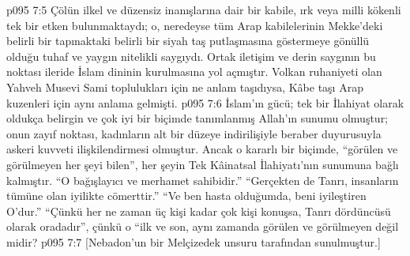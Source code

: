 \vs p095 7:5 Çölün ilkel ve düzensiz inanışlarına dair bir kabile, ırk veya milli kökenli tek bir etken bulunmaktaydı; o, neredeyse tüm Arap kabilelerinin Mekke’deki belirli bir tapınaktaki belirli bir siyah taş putlaşmasına göstermeye gönüllü olduğu tuhaf ve yaygın nitelikli saygıydı. Ortak iletişim ve derin saygının bu noktası ileride İslam dininin kurulmasına yol açmıştır. Volkan ruhaniyeti olan Yahveh Musevi Sami toplulukları için ne anlam taşıdıysa, Kâbe taşı Arap kuzenleri için aynı anlama gelmişti.
\vs p095 7:6 İslam’ın gücü; tek bir İlahiyat olarak oldukça belirgin ve çok iyi bir biçimde tanımlanmış Allah’ın sunumu olmuştur; onun zayıf noktası, kadınların alt bir düzeye indirilişiyle beraber duyurusuyla askeri kuvveti ilişkilendirmesi olmuştur. Ancak o kararlı bir biçimde, “görülen ve görülmeyen her şeyi bilen”, her şeyin Tek Kâinatsal İlahiyatı’nın sunumuna bağlı kalmıştır. “O bağışlayıcı ve merhamet sahibidir.” “Gerçekten de Tanrı, insanların tümüne olan iyilikte cömerttir.” “Ve ben hasta olduğumda, beni iyileştiren O’dur.” “Çünkü her ne zaman üç kişi kadar çok kişi konuşsa, Tanrı dördüncüsü olarak oradadır”, çünkü o “ilk ve son, aynı zamanda görülen ve görülmeyen değil midir?
\vs p095 7:7 [Nebadon’un bir Melçizedek unsuru tarafından sunulmuştur.]
